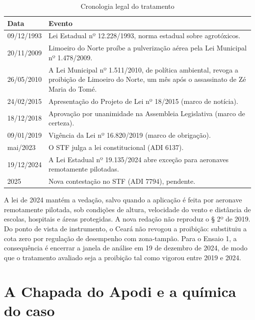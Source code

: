 \begin{table}[htb]
\centering
\caption{Cronologia legal do tratamento}
\label{tab:cronologia}
\small
\begin{tabular}{lp{11cm}}
\toprule
Data & Evento \\
\midrule
09/12/1993 & Lei Estadual nº 12.228/1993, norma estadual sobre agrotóxicos. \\
20/11/2009 & Limoeiro do Norte proíbe a pulverização aérea pela Lei Municipal
             nº 1.478/2009. \\
26/05/2010 & A Lei Municipal nº 1.511/2010, de política ambiental, revoga a
             proibição de Limoeiro do Norte, um mês após o assassinato de Zé
             Maria do Tomé. \\
24/02/2015 & Apresentação do Projeto de Lei nº 18/2015 (marco de notícia). \\
18/12/2018 & Aprovação por unanimidade na Assembleia Legislativa (marco de
             certeza). \\
09/01/2019 & Vigência da Lei nº 16.820/2019 (marco de obrigação). \\
mai/2023   & O STF julga a lei constitucional (ADI 6137). \\
19/12/2024 & A Lei Estadual nº 19.135/2024 abre exceção para aeronaves
             remotamente pilotadas. \\
2025       & Nova contestação no STF (ADI 7794), pendente. \\
\bottomrule
\end{tabular}
\end{table}

A lei de 2024 mantém a vedação, salvo quando a aplicação é feita por aeronave
remotamente pilotada, sob condições de altura, velocidade do vento e distância
de escolas, hospitais e áreas protegidas. A nova redação não reproduz o § 2º de
2019. Do ponto de vista de instrumento, o Ceará não revogou a proibição:
substituiu a cota zero por regulação de desempenho com zona-tampão. Para o
Ensaio 1, a consequência é encerrar a janela de análise em 19 de dezembro de
2024, de modo que o tratamento avaliado seja a proibição tal como vigorou entre
2019 e 2024.

\section{A Chapada do Apodi e a química do caso}
\label{sec:chapada}

